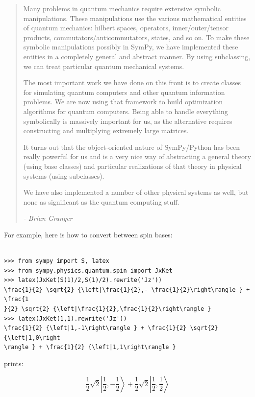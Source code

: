 \documentclass[12pt]{article}
\begin{document}
\begin{quotation}
Many problems in quantum mechanics require extensive symbolic
manipulations.  These manipulations use the various mathematical
entities of quantum mechanics:  hilbert spaces, operators,
inner/outer/tensor products, commutators/anticommutators, states,
and so on.  To make these symbolic manipulations possibly in SymPy, we have
implemented these entities in a completely general and abstract
manner.  By using subclassing, we can treat particular quantum
mechanical systems.

The most important work we have done on this front is to create
classes for simulating quantum computers and other quantum information
problems.  We are now using that framework to build optimization
algorithms for quantum computers.  Being able to handle everything
symbolically is massively important for us, as the alternative
requires constructing and multiplying extremely large matrices.

It turns out that the object-oriented nature of SymPy/Python has been
really powerful for us and is a very nice way of abstracting a general
theory (using base classes) and particular realizations of that theory in
physical systems (using subclasses).

We have also implemented a number of other physical systems as well,
but none as significant as the quantum computing stuff.

{\em - Brian Granger}
\end{quotation}

For example, here is how to convert between spin bases:

\begin{Verbatim}[fontsize=\scriptsize,fontfamily=courier,fontshape=tt,frame=single,label=SymPy]

>>> from sympy import S, latex
>>> from sympy.physics.quantum.spin import JxKet
>>> latex(JxKet(S(1)/2,S(1)/2).rewrite('Jz'))
\frac{1}{2} \sqrt{2} {\left|\frac{1}{2},- \frac{1}{2}\right\rangle } + \frac{1
}{2} \sqrt{2} {\left|\frac{1}{2},\frac{1}{2}\right\rangle }
>>> latex(JxKet(1,1).rewrite('Jz'))
\frac{1}{2} {\left|1,-1\right\rangle } + \frac{1}{2} \sqrt{2} {\left|1,0\right
\rangle } + \frac{1}{2} {\left|1,1\right\rangle }

\end{Verbatim}
prints:

\[
\frac{1}{2} \sqrt{2} {\left|\frac{1}{2},- \frac{1}{2}\right\rangle } + \frac{1
}{2} \sqrt{2} {\left|\frac{1}{2},\frac{1}{2}\right\rangle }
\]
\end{document}
